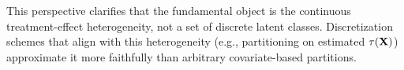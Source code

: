 \documentclass{article}
\newcommand{\PP}{\mathbb{P}}
\begin{document}
This perspective clarifies that the fundamental object is the continuous treatment-effect heterogeneity, not a set of discrete latent classes. Discretization schemes that align with this heterogeneity (e.g., partitioning on estimated $\tau(\mathbf{X})$) approximate it more faithfully than arbitrary covariate-based partitions.

%
%
%
%
%
%
\end{document}
